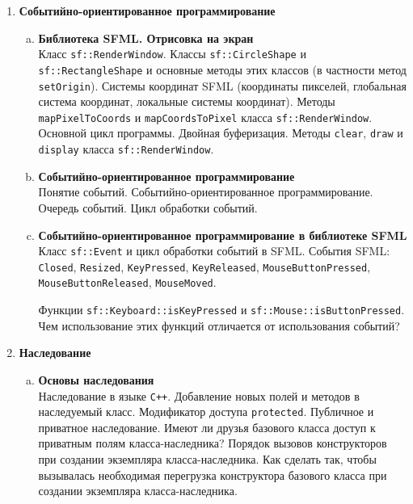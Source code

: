 \documentclass{article}
\begin{document}
\begin{enumerate}
\item \textbf{Событийно-ориентированное программирование}
\begin{enumerate}[a.]
\item \textbf{Библиотека SFML. Отрисовка на экран}\\
Класс \texttt{sf::RenderWindow}. Классы \texttt{sf::CircleShape} и \texttt{sf::RectangleShape} и основные методы этих классов (в частности метод \texttt{setOrigin}). Системы координат SFML (координаты пикселей, глобальная система координат, локальные системы координат). Методы \texttt{mapPixelToCoords} и \texttt{mapCoordsToPixel} класса \texttt{sf::RenderWindow}. Основной цикл программы. Двойная буферизация. Методы \texttt{clear}, \texttt{draw} и \texttt{display} класса \texttt{sf::RenderWindow}. 

\item \textbf{Событийно-ориентированное программирование}\\
Понятие событий. Событийно-ориентированное программирование. Очередь событий. Цикл обработки событий.

\item \textbf{Событийно-ориентированное программирование в библиотеке SFML}\\
Класс \texttt{sf::Event} и цикл обработки событий в SFML.
События SFML: \texttt{Closed}, \texttt{Resized}, \texttt{KeyPressed}, \texttt{KeyReleased}, \texttt{MouseButtonPressed},  \texttt{MouseButtonReleased}, \texttt{MouseMoved}.

Функции \texttt{sf::Keyboard::isKeyPressed} и \texttt{sf::Mouse::isButtonPressed}. Чем использование этих функций отличается от использования событий?
\end{enumerate}





\item \textbf{Наследование}
\begin{enumerate}[a.]
\item \textbf{Основы наследования}\\
Наследование в языке \texttt{C++}. Добавление новых полей и методов в наследуемый класс. Модификатор доступа \texttt{protected}. Публичное и приватное наследование. Имеют ли друзья базового класса доступ к приватным полям класса-наследника? 
Порядок вызовов конструкторов при создании экземпляра класса-наследника. Как сделать так, чтобы вызывалась необходимая перегрузка конструктора базового класса при создании экземпляра класса-наследника.


\end{enumerate}
\end{enumerate}
\end{document}
